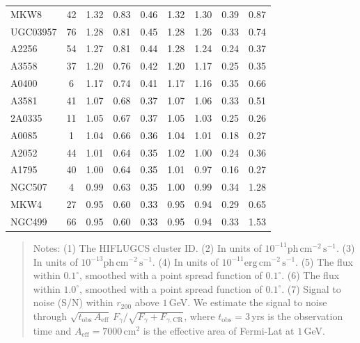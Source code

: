 \documentclass[10pt,aps,pra,reprint,amsmath,amsfonts,amssymb,showpacs,nofootinbib,floatfix]{revtex4-1}
\newcommand{\rmn}{\mathrm}
\newcommand{\cm}{\rmn{cm}}
\newcommand{\CR}{\rmn{CR}}
\newcommand{\rvir}{r_{200}}
\begin{document}
\begin{table}
\begin{minipage}{2.0\columnwidth}
\begin{tabular}{l  c c c c c c c c}
MKW8     &  42 &   1.32 &   0.83 &   0.46 &   1.32 &   1.30 &   0.39 &   0.87 \\
UGC03957 &  76 &   1.28 &   0.81 &   0.45 &   1.28 &   1.26 &   0.33 &   0.74 \\
A2256    &  54 &   1.27 &   0.81 &   0.44 &   1.28 &   1.24 &   0.24 &   0.37 \\
A3558    &  37 &   1.20 &   0.76 &   0.42 &   1.20 &   1.17 &   0.25 &   0.35 \\
A0400    &   6 &   1.17 &   0.74 &   0.41 &   1.17 &   1.16 &   0.35 &   0.66 \\
A3581    &  41 &   1.07 &   0.68 &   0.37 &   1.07 &   1.06 &   0.33 &   0.51 \\
2A0335   &  11 &   1.05 &   0.67 &   0.37 &   1.05 &   1.03 &   0.25 &   0.26 \\
A0085    &   1 &   1.04 &   0.66 &   0.36 &   1.04 &   1.01 &   0.18 &   0.27 \\
A2052    &  44 &   1.01 &   0.64 &   0.35 &   1.02 &   1.00 &   0.24 &   0.36 \\
A1795    &  40 &   1.00 &   0.64 &   0.35 &   1.01 &   0.97 &   0.16 &   0.27 \\
NGC507   &   4 &   0.99 &   0.63 &   0.35 &   1.00 &   0.99 &   0.34 &   1.28 \\
MKW4     &  27 &   0.95 &   0.60 &   0.33 &   0.95 &   0.94 &   0.29 &   0.65 \\
NGC499   &  66 &   0.95 &   0.60 &   0.33 &   0.95 &   0.94 &   0.33 &   1.53 \\
\hline
\hline
\end{tabular}
\begin{quote}
  Notes: 
   (1) The HIFLUGCS cluster ID.
   (2) In units of  $10^{-11} \rmn{ph}\,\rmn{cm}^{-2}\,\rmn{s}^{-1}$.
   (3) In units of  $10^{-13} \rmn{ph}\,\rmn{cm}^{-2}\,\rmn{s}^{-1}$.
   (4) In units of  $10^{-11} \rmn{erg}\,\rmn{cm}^{-2}\,\rmn{s}^{-1}$.
   (5) The flux within $0.1^\circ$, smoothed with a point spread function of $0.1^\circ$. 
   (6) The flux within $1.0^\circ$, smoothed with a point spread function of $0.1^\circ$. 
   (7) Signal to noise (S/N) within $\rvir$ above $1\,$GeV. We estimate the signal to 
  noise through $\sqrt{t_\rmn{obs}\,A_\rmn{eff}}\,F_{\gamma}/\sqrt{F_{\gamma}+F_{\gamma,\CR}}$, 
  where $t_\rmn{obs}=3\,$yrs is the observation time and $A_\rmn{eff} = 7000\,\cm^2$ 
    is the effective area of Fermi-Lat at $1\,$GeV.
  \label{tab:flux_tab_BM}
  \end{quote}
\end{minipage}
\end{table} 
\end{document}
